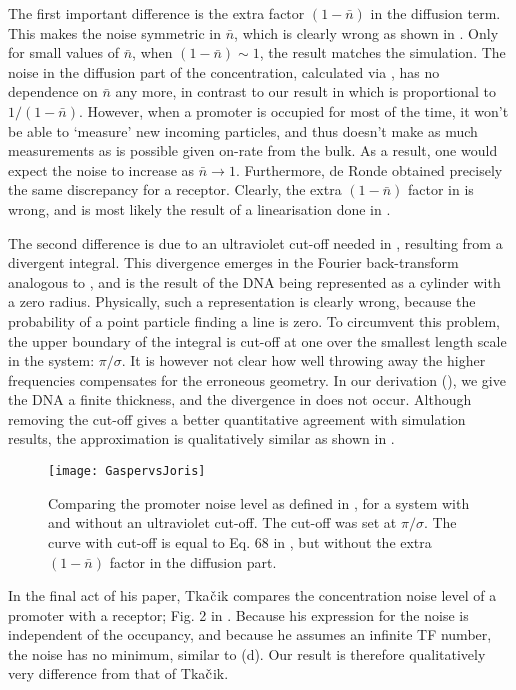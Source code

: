 The first important difference is the extra factor $(1-\bar{n})$ in the diffusion term. This makes the noise symmetric in $\bar{n}$, which is clearly wrong as shown in . Only for small values of $\bar{n}$, when $(1-\bar{n})\sim 1$, the result matches the simulation. The noise in the diffusion part of the concentration, calculated via , has no dependence on $\bar{n}$ any more, in contrast to our result in  which is proportional to $1/(1-\bar{n})$. However, when a promoter is occupied for most of the time, it won't be able to `measure' new incoming particles, and thus doesn't make as much measurements as is possible given on-rate from the bulk. As a result, one would expect the noise to increase as $\bar{n}\to1$. Furthermore, de Ronde \cite{DeRonde2012} obtained precisely the same discrepancy for a receptor. Clearly, the extra $(1-\bar{n})$ factor in  is wrong, and is most likely the result of a linearisation done in \cite{Tkacik2009}. 

The second difference is due to an ultraviolet cut-off needed in \cite{Tkacik2009}, resulting from a divergent integral. This divergence emerges in the Fourier back-transform analogous to , and is the result of the DNA being represented as a cylinder with a zero radius. Physically, such a representation is clearly wrong, because the probability of a point particle finding a line is zero. To circumvent this problem, the upper boundary of the integral is cut-off at one over the smallest length scale in the system: $\pi/\sigma$. It is however not clear how well throwing away the higher frequencies compensates for the erroneous geometry. In our derivation (), we give the DNA a finite thickness, and the divergence in  does not occur. Although removing the cut-off gives a better quantitative agreement with simulation results, the approximation is qualitatively similar as shown in .
\begin{figure}
\centering
\texttt{[image: GaspervsJoris]}
\caption{ Comparing the promoter noise level as defined in , for a system with and without an ultraviolet cut-off. The cut-off was set at $\pi/\sigma$. The curve with cut-off is equal to Eq. 68 in \cite{Tkacik2009}, but without the extra $(1-\bar{n})$ factor in the diffusion part.}
\end{figure}

In the final act of his paper, Tka$\check{\rm c}$ik compares the concentration noise level of a promoter with a receptor; Fig. 2 in \cite{Tkacik2009}. Because his expression for the noise is independent of the occupancy, and because he assumes an infinite TF number, the noise has no minimum, similar to  (d). Our result is therefore qualitatively very difference from that of Tka$\check{\rm c}$ik.



